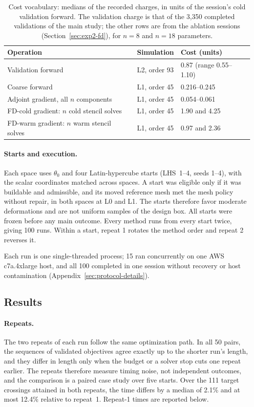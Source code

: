 \begin{table}[H]\centering\small
\caption{Cost vocabulary: medians of the recorded charges, in units of
the session's cold validation forward. The validation charge is that of
the 3,350 completed validations of the main study; the other rows are
from the ablation sessions (Section~\ref{sec:exp2-fd}), for $n=8$ and
$n=18$ parameters.}
\label{tab:costs}
\begin{tabular}{lll}\toprule
Operation & Simulation & Cost (units)\\\midrule
Validation forward & L2, order 93 & 0.87 (range 0.55--1.10)\\
Coarse forward & L1, order 45 & 0.216--0.245\\
Adjoint gradient, all $n$ components & L1, order 45 & 0.054--0.061\\
FD-cold gradient: $n$ cold stencil solves & L1, order 45 & 1.90 and 4.25\\
FD-warm gradient: $n$ warm stencil solves & L1, order 45 & 0.97 and 2.36\\\bottomrule
\end{tabular}
\end{table}

\paragraph{Starts and execution.}
Each space uses $\theta_0$ and four Latin-hypercube starts (LHS~1--4, seeds 1--4),
with the scalar coordinates matched across spaces. A start was eligible
only if it was buildable and admissible, and its moved reference mesh met
the mesh policy without repair, in both spaces at L0 and L1. The starts
therefore favor moderate deformations and are not uniform samples of the
design box. All starts were frozen before any main outcome. Every method
runs from every start twice, giving 100 runs. Within a start, repeat 1
rotates the method order and repeat 2 reverses it.

Each run is one single-threaded process; 15 ran concurrently on one AWS
c7a.4xlarge host, and all 100 completed in one session without recovery or
host contamination (Appendix~\ref{sec:protocol-details}).

\subsection{Results}\label{sec:exp2-results}
\paragraph{Repeats.}
The two repeats of each run follow the same optimization path. In all 50
pairs, the sequences of validated objectives agree exactly up to the
shorter run's length, and they differ in length only when the budget or a
solver stop cuts one repeat earlier. The repeats therefore measure timing
noise, not independent outcomes, and the comparison is a paired case study
over five starts. Over the 111 target crossings attained in both repeats,
the time differs by a median of 2.1\% and at most 12.4\% relative to
repeat~1. Repeat-1 times are reported below.

